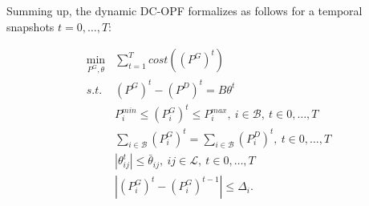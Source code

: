 Summing up, the dynamic DC-OPF formalizes as follows for a temporal snapshots $t = 0, \dots, T$:

\begin{equation}
    \begin{aligned}
        \min_{P^G, \theta}  & \sum_{t=1}^T\textit{cost}((P^G)^t) \\
        \textit{s.t. }      & (P^G)^t - (P^D)^t = B\theta^t\\
                            & P_i^{min} \leq (P_i^G)^t \leq P_i^{max}, ~ i \in \mathcal{B}, ~ t \in 0, \dots, T \\ 
                            & \sum_{i \in \mathcal{B}} (P^G_i)^t = \sum_{i \in \mathcal{B}} (P^D_i)^t, ~ t \in 0, \dots, T \\
                            & |\theta_{ij}^t| \leq \bar{\theta}_{ij}, ~ ij \in \mathcal{L}, ~ t \in 0, \dots, T \\
                            & |(P^G_i)^t - (P^G_i)^{t-1}| \leq \Delta_i.\\
    \end{aligned}
    \label{eq:dyn-dc-opf}
\end{equation}
